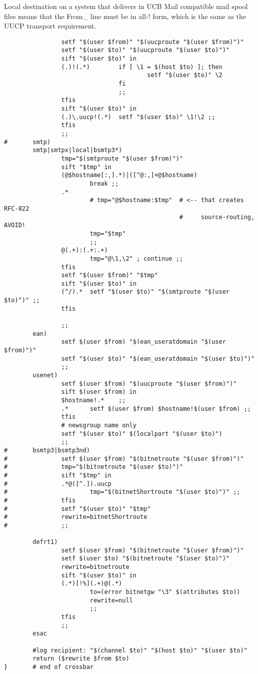 Local destination on a system that delivers in UCB Mail
compatible mail spool files means that the From\_ line
must be in all-! form, which is the same as the UUCP
transport requirement.
\begin{tscreen}
\begin{verbatim}
                setf "$(user $from)" "$(uucproute "$(user $from)")"
                setf "$(user $to)" "$(uucproute "$(user $to)")"
                sift "$(user $to)" in
                (.)!(.*)        if [ \1 = $(host $to) ]; then
                                        setf "$(user $to)" \2
                                fi
                                ;;
                tfis
                sift "$(user $to)" in
                (.)\.uucp!(.*)  setf "$(user $to)" \1!\2 ;;
                tfis
                ;;
#       smtp)
        smtp|smtpx|local|bsmtp3*)
                tmp="$(smtproute "$(user $from)")"
                sift "$tmp" in
                (@$hostname[:,].*)|([^@:,]+@$hostname)
                        break ;;
                .*
                        # tmp="@$hostname:$tmp"  # <-- that creates RFC-822
                                                 #     source-routing, AVOID!
                        tmp="$tmp"
                        ;;
                @(.+):(.+:.+)
                        tmp="@\1,\2" ; continue ;;
                tfis
                setf "$(user $from)" "$tmp"
                sift "$(user $to)" in
                (^/).*  setf "$(user $to)" "$(smtproute "$(user $to)")" ;;
                tfis

                ;;
        ean)    
                setf $(user $from) "$(ean_useratdomain "$(user $from)")"
                setf "$(user $to)" "$(ean_useratdomain "$(user $to)")"
                ;;
        usenet)
                setf $(user $from) "$(uucproute "$(user $from)")"
                sift $(user $from) in
                $hostname!.*    ;;
                .*      setf $(user $from) $hostname!$(user $from) ;;
                tfis
                # newsgroup name only
                setf "$(user $to)" $(localpart "$(user $to)")
                ;;
#       bsmtp3|bsmtp3nd)
#               setf $(user $from) "$(bitnetroute "$(user $from)")"
#               tmp="$(bitnetroute "$(user $to)")"
#               sift "$tmp" in
#               .*@([^.]).uucp
#                       tmp="$(bitnetShortroute "$(user $to)")" ;;
#               tfis
#               setf "$(user $to)" "$tmp"
#               rewrite=bitnetShortroute
#               ;;

        defrt1)
                setf $(user $from) "$(bitnetroute "$(user $from)")"
                setf $(user $to) "$(bitnetroute "$(user $to)")"
                rewrite=bitnetroute
                sift "$(user $to)" in
                (.*)[!%](.+)@(.*)
                        to=(error bitnetgw "\3" $(attributes $to))
                        rewrite=null
                        ;;
                tfis
                ;;
        esac

        #log recipient: "$(channel $to)" "$(host $to)" "$(user $to)"
        return ($rewrite $from $to)
}       # end of crossbar
\end{verbatim}
\end{tscreen}


